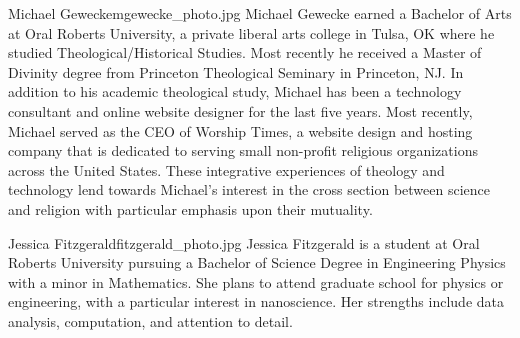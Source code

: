 \newpage
\begin{authorbio}{Michael Gewecke}{mgewecke_photo.jpg}{}
Michael Gewecke earned a Bachelor of Arts at Oral Roberts University, a private liberal arts college in Tulsa, OK where he studied Theological/Historical Studies.  Most recently he received a Master of Divinity degree from Princeton Theological Seminary in Princeton, NJ.  In addition to his academic theological study, Michael has been a technology consultant and online website designer for the last five years.  Most recently, Michael served as the CEO of Worship Times, a website design and hosting company that is dedicated to serving small non-profit religious organizations across the United States.  These integrative experiences of theology and technology lend towards Michael's interest in the cross section between science and religion with particular emphasis upon their mutuality.   
\end{authorbio}

\begin{authorbio}{Jessica Fitzgerald}{fitzgerald_photo.jpg}{}
Jessica Fitzgerald is a student at Oral Roberts University pursuing a Bachelor of Science Degree in Engineering Physics with a minor in Mathematics. She plans to attend graduate school for physics or engineering, with a particular interest in nanoscience. Her strengths include data analysis, computation, and attention to detail.
\end{authorbio}

~

